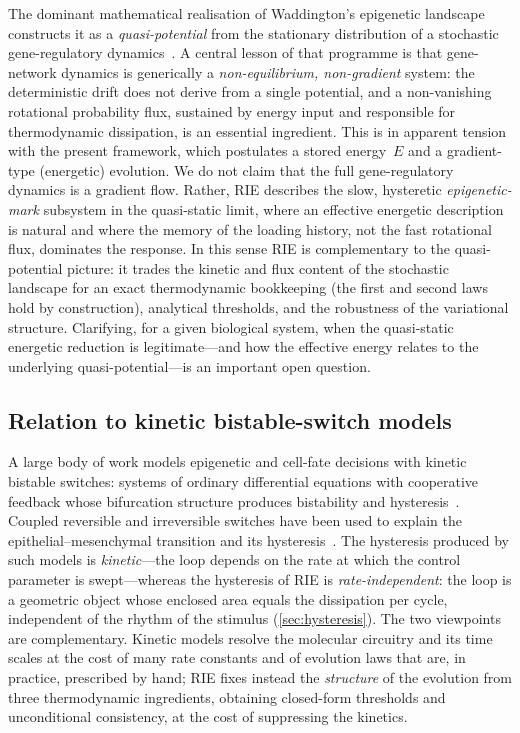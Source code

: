 The dominant mathematical realisation of Waddington's epigenetic
landscape~\cite{Waddington1957,Huang2012} constructs it as a
\emph{quasi-potential} from the stationary distribution of a stochastic
gene-regulatory dynamics~\cite{Wang2008,Ferrell2012}. A central lesson
of that programme is that gene-network dynamics is generically a
\emph{non-equilibrium, non-gradient} system: the deterministic drift
does not derive from a single potential, and a non-vanishing rotational
probability flux, sustained by energy input and responsible for
thermodynamic dissipation, is an essential ingredient. This is in
apparent tension with the present framework, which postulates a stored
energy~$E$ and a gradient-type (energetic) evolution. We do not claim
that the full gene-regulatory dynamics is a gradient flow. Rather, RIE
describes the slow, hysteretic \emph{epigenetic-mark} subsystem in the
quasi-static limit, where an effective energetic description is natural
and where the memory of the loading history, not the fast rotational
flux, dominates the response. In this sense RIE is complementary to the
quasi-potential picture: it trades the kinetic and flux content of the
stochastic landscape for an exact thermodynamic bookkeeping (the first
and second laws hold by construction), analytical thresholds, and the
robustness of the variational structure. Clarifying, for a given
biological system, when the quasi-static energetic reduction is
legitimate---and how the effective energy relates to the underlying
quasi-potential---is an important open question.

\subsection{Relation to kinetic bistable-switch models}
\label{sec:kinetic_models}

A large body of work models epigenetic and cell-fate decisions with
kinetic bistable switches: systems of ordinary differential equations
with cooperative feedback whose bifurcation structure produces
bistability and hysteresis~\cite{Huang2007,Ferrell2012}. Coupled reversible and
irreversible switches have been used to explain the
epithelial--mesenchymal transition and its hysteresis~\cite{Tian2013,
CeliaTerrassa2018}. The hysteresis produced by such models is
\emph{kinetic}---the loop depends on the rate at which the control
parameter is swept---whereas the hysteresis of RIE is
\emph{rate-independent}: the loop is a geometric object whose enclosed
area equals the dissipation per cycle, independent of the rhythm of the
stimulus (\cref{sec:hysteresis}). The two viewpoints are complementary.
Kinetic models resolve the molecular circuitry and its time scales at
the cost of many rate constants and of evolution laws that are, in
practice, prescribed by hand; RIE fixes instead the \emph{structure} of
the evolution from three thermodynamic ingredients, obtaining
closed-form thresholds and unconditional consistency, at the cost of
suppressing the kinetics.

